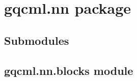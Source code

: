 \documentclass[letterpaper,10pt,english]{sphinxmanual}
\begin{document}
\chapter{gqcml.nn package}
\label{\detokenize{modules/gqcml.nn:gqcml-nn-package}}\label{\detokenize{modules/gqcml.nn::doc}}

\section{Submodules}
\label{\detokenize{modules/gqcml.nn:submodules}}

\section{gqcml.nn.blocks module}
\label{\detokenize{modules/gqcml.nn:module-gqcml.nn.blocks}}\label{\detokenize{modules/gqcml.nn:gqcml-nn-blocks-module}}
\end{document}
